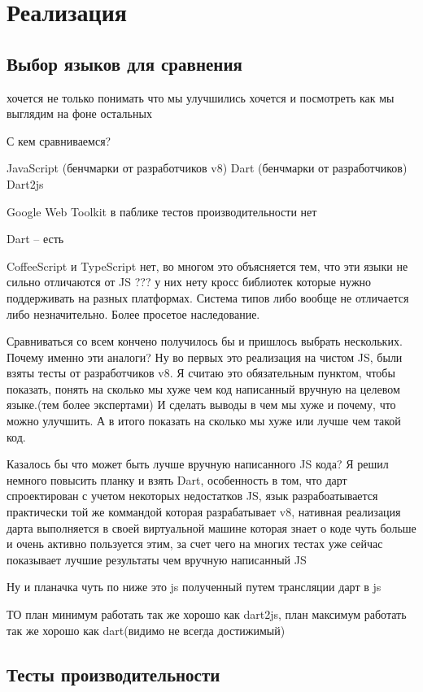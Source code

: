 \chapter{Реализация}

\section{Выбор языков для сравнения}

хочется не только понимать что мы улучшились хочется и посмотреть как мы выглядим на фоне остальных

С кем сравниваемся?

JavaScript (бенчмарки от разработчиков v8)
Dart (бенчмарки от разработчиков)
Dart2js

Google Web Toolkit
в паблике тестов производительности нет

Dart -- есть

CoffeeScript и TypeScript нет, во многом это объясняется тем, что эти языки не сильно отличаются от JS ??? у них нету кросс библиотек которые нужно поддерживать на разных платформах. Система типов либо вообще не отличается либо незначительно. Более просетое наследование.

Сравниваться со всем кончено получилось бы и пришлось выбрать нескольких.
Почему именно эти аналоги?
Ну во первых это реализация на чистом JS, были взяты тесты от разработчиков v8. Я считаю это обязательным пунктом, чтобы показать, понять на сколько мы хуже чем код написанный вручную на целевом языке.(тем более экспертами) И сделать выводы в чем мы хуже и почему, что можно улучшить. А в итого показать на сколько мы хуже или лучше чем такой код.

Казалось бы что может быть лучше вручную написанного JS кода? Я решил немного повысить планку и взять Dart, особенность в том, что дарт спроектирован с учетом некоторых недостатков JS, язык разрабоатывается практически той же коммандой которая разрабатывает v8, нативная реализация дарта выполняется в своей виртуальной машине которая знает о коде чуть больше и очень активно пользуется этим, за счет чего на многих тестах уже сейчас показывает лучшие результаты чем вручную написанный JS

Ну и планачка чуть по ниже это js полученный путем трансляции дарт в js

ТО план минимум работать так же хорошо как dart2js, план максимум работать так же хорошо как dart(видимо не всегда достижимый)



\section{Тесты производительности}

